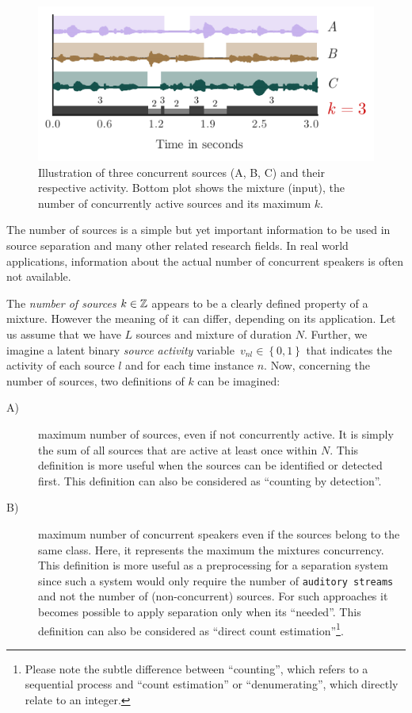 \begin{figure}[h]
  \centering
  \includegraphics[width=0.8\columnwidth]{Chapters/08_Analysis_CountNet/figures/teaser.pdf}
  \caption{Illustration of three concurrent sources (A, B, C) and their respective activity. Bottom plot shows the mixture (input), the number of concurrently active sources and its maximum \(k\).}%
  \label{fig:teaser}%
\end{figure}

The number of sources is a simple but yet important information to be used in source separation and many other related research fields.
In real world applications, information about the actual number of concurrent speakers is often not available.
\par
The \emph{number of sources} \(k \in {\mathbb{Z}}\) appears to be a clearly defined property of a mixture. 
However the meaning of it can differ, depending on its application.
Let us assume that we have \(L\) sources and mixture of duration \(N\).
Further, we imagine a latent binary \textit{source activity} variable~$v_{nl}\in \left\{ 0,1 \right\}$ that indicates the activity of each source \(l\) and for each time instance \(n\).
Now, concerning the number of sources, two definitions of \(k\) can be imagined:

\begin{description}
\item[A)] maximum number of sources, even if not concurrently active. It is simply the sum of all sources that are active at least once within \(N\). This definition is more useful when the sources can be identified or detected first. This definition can also be considered as ``counting by detection''.
\item[B)] maximum number of concurrent speakers even if the sources belong to the same class. Here, it represents the maximum the mixtures concurrency. This definition is more useful as a preprocessing for a separation system since such a system would only require the number of \texttt{auditory\ streams} and not the number of (non-concurrent) sources. For such approaches it becomes possible to apply separation only when its ``needed''. This definition can also be considered as ``direct count estimation''\footnote{Please note the subtle difference between ``counting'', which refers to a sequential process and ``count estimation'' or ``denumerating'', which directly relate to an integer.}.
\end{description}

